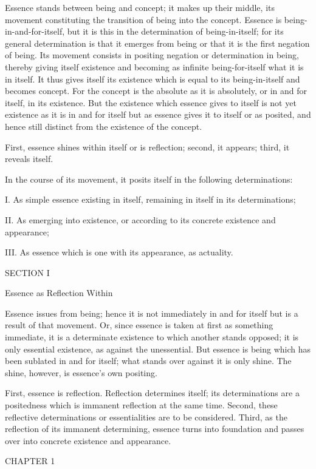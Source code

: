 Essence stands between being and concept;
it makes up their middle,
its movement constituting the transition
of being into the concept.
Essence is being-in-and-for-itself,
but it is this in the determination of being-in-itself;
for its general determination is that it emerges from being
or that it is the first negation of being.
Its movement consists in positing negation
or determination in being,
thereby giving itself existence
and becoming as infinite being-for-itself
what it is in itself.
It thus gives itself its existence
which is equal to its being-in-itself
and becomes concept.
For the concept is the absolute
as it is absolutely,
or in and for itself,
in its existence.
But the existence which essence gives to itself is
not yet existence as it is in and for itself
but as essence gives it to itself or as posited,
and hence still distinct from the existence of the concept.

First, essence shines within itself
or is reflection;
second, it appears;
third, it reveals itself.

In the course of its movement,
it posits itself in the following determinations:

I. As simple essence existing in itself,
remaining in itself in its determinations;

II. As emerging into existence,
or according to its concrete existence and appearance;

III. As essence which is one with its appearance,
as actuality.

SECTION I

Essence as Reflection Within

Essence issues from being;
hence it is not immediately in and for itself
but is a result of that movement.
Or, since essence is taken at first as something immediate,
it is a determinate existence to which another stands opposed;
it is only essential existence, as against the unessential.
But essence is being which has been sublated in and for itself;
what stands over against it is only shine.
The shine, however, is essence's own positing.

First, essence is reflection.
Reflection determines itself;
its determinations are a positedness
which is immanent reflection at the same time.
Second, these reflective determinations
or essentialities are to be considered.
Third, as the reflection of its immanent determining,
essence turns into foundation and passes over
into concrete existence and appearance.

CHAPTER 1

